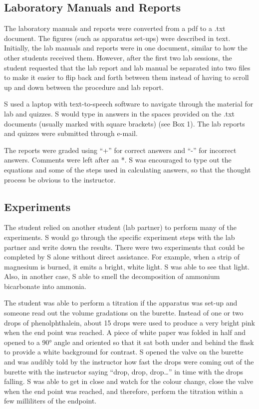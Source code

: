 \documentclass[11.5pt]{sig-alternate} %
\begin{document}
\begin{large}
\subsection*{Laboratory Manuals and Reports}

The laboratory manuals and reports were converted from a pdf to a .txt document.  The figures (such as apparatus set-ups) were described in text.  Initially, the lab manuals and reports were in one document, similar to how the other students received them.  However, after the first two lab sessions, the student requested that the lab report and lab manual be separated into two files to make it easier to flip back and forth between them instead of having to scroll up and down between the procedure and lab report.

S used a laptop with text-to-speech software to navigate through the material for lab and quizzes.  S would type in answers in the spaces provided on the .txt documents (usually marked with square brackets) (see Box 1).  The lab reports and quizzes were submitted through e-mail.  

The reports were graded using “+” for correct answers and “-” for incorrect answers.  Comments were left after an *.  S was encouraged to type out the equations and some of the steps used in calculating answers, so that the thought process be obvious to the instructor.

\subsection*{Experiments}

The student relied on another student (lab partner) to perform many of the experiments.  S would go through the specific experiment steps with the lab partner and write down the results.  There were two experiments that could be completed by S alone without direct assistance.  For example, when a strip of magnesium is burned, it emits a bright, white light.  S was able to see that light.  Also, in another case, S able to smell the decomposition of ammonium bicarbonate into ammonia.  

The student was able to perform a titration if the apparatus was set-up and someone read out the volume gradations on the burette.  Instead of one or two drops of phenolphthalein, about 15 drops were used to produce a very bright pink when the end point was reached.  A piece of white paper was folded in half and opened to a 90° angle and oriented so that it sat both under and behind the flask to provide a white background for contrast.  S opened the valve on the burette and was audibly told by the instructor how fast the drops were coming out of the burette with the instructor saying “drop, drop, drop…” in time with the drops falling.  S was able to get in close and watch for the colour change, close the valve when the end point was reached, and therefore, perform the titration within a few milliliters of the endpoint.


\end{large}
\end{document}
